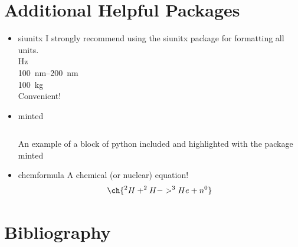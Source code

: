 \documentclass[hidelinks, 12pt]{article}%
\begin{document}
    \section{Additional Helpful Packages}
        \begin{itemize}
        \item siunitx
            I strongly recommend using the siunitx package for formatting all units.
            \\\si{\hertz}
            \\\SIrange{100}{200}{\nano\meter}
            \\\SI{100}{\kilo\gram}
            \\Convenient!

        \item minted
            \begin{listing}[H]
                \inputminted{python}{./demo.py}
                \caption{An example of a block of python included and highlighted with the package minted}
                \label{lst:pythonExample}
            \end{listing}

        \item chemformula
            A chemical (or nuclear) equation!
            \begin{equation}
                \ch{
                ^{2}H + ^{2}H -> ^{3}He + n^{0}
                }
                \label{eqt:nucEnerReleased}
            \end{equation}
            \end{itemize}


    \section{Bibliography}
\end{document}
